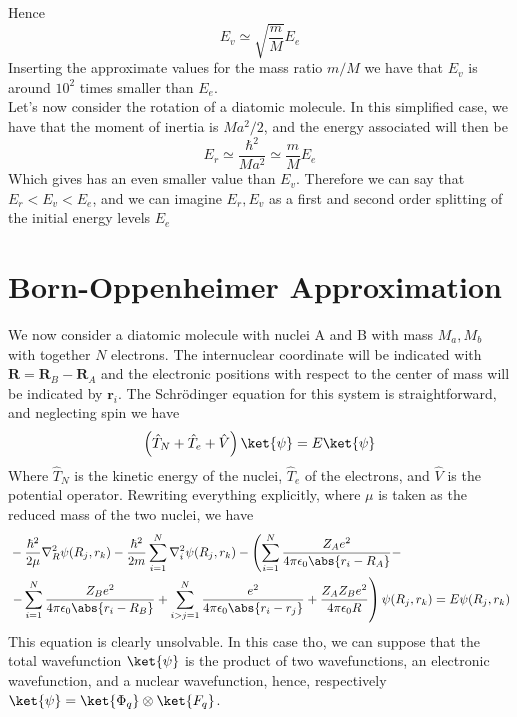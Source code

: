 \documentclass[a4paper, 11pt]{book}
\renewcommand{\vec}[1]{\mathbf{#1}}
\newcommand{\1}{\opr{\mathds{1}}}
\newcommand{\opr}[1]{\hat{#1}}
\theoremstyle{plain}
\begin{document}
	Hence
	\begin{equation*}
		E_v\simeq\sqrt{\frac{m}{M}}E_e
	\end{equation*}
	Inserting the approximate values for the mass ratio $m/M$ we have that $E_v$ is around $10^{2}$ times smaller than $E_e$.\\
	Let's now consider the rotation of a diatomic molecule. In this simplified case, we have that the moment of inertia is $Ma^2/2$, and the energy associated will then be
	\begin{equation*}
		E_r\simeq\frac{\hbar^2}{Ma^2}\simeq\frac{m}{M}E_e
	\end{equation*}
	Which gives has an even smaller value than $E_v$. Therefore we can say that $E_r<E_v<E_e$, and we can imagine $E_r,E_v$ as a first and second order splitting of the initial energy levels $E_e$
	\section{Born-Oppenheimer Approximation}
	We now consider a diatomic molecule with nuclei A and B with mass $M_a,M_b$ with together $N$ electrons. The internuclear coordinate will be indicated with $\vec{R}=\vec{R}_B-\vec{R}_A$ and the electronic positions with respect to the center of mass will be indicated by $\vec{r}_i$. The Schrödinger equation for this system is straightforward, and neglecting spin we have
	\begin{equation}
		\left( \opr{T}_N+\opr{T}_e+\opr{V} \right)\ket{\psi}=E\ket{\psi}
		\label{eq:diatomicmolhamiltonian}
	\end{equation}
	Where $\opr{T}_N$ is the kinetic energy of the nuclei, $\opr{T}_e$ of the electrons, and $\opr{V}$ is the potential operator. Rewriting everything explicitly, where $\mu$ is taken as the reduced mass of the two nuclei, we have
	\begin{equation}
		\begin{aligned}
			&-\frac{\hbar^2}{2\mu}\nabla_R^2\psi(R_j,r_k)-\frac{\hbar^2}{2m}\sum_{i=1}^N\nabla_i^2\psi(R_j,r_k)-\left(\sum_{i=1}^N\frac{Z_Ae^2}{4\pi\epsilon_0\abs{r_i-R_A}}-\right.\\
		&\left.-\sum_{i=1}^N\frac{Z_Be^2}{4\pi\epsilon_0\abs{r_i-R_B}}+\sum_{i>j=1}^N\frac{e^2}{4\pi\epsilon_0\abs{r_i-r_j}}+\frac{Z_AZ_Be^2}{4\pi\epsilon_0R}\right)\psi(R_j,r_k)=E\psi(R_j,r_k)
		\end{aligned}
		\label{eq:diatomicmolschrcomp}
	\end{equation}
	This equation is clearly unsolvable. In this case tho, we can suppose that the total wavefunction $\ket{\psi}$ is the product of two wavefunctions, an electronic wavefunction, and a nuclear wavefunction, hence, respectively $\ket{\psi}=\ket{\Phi_q}\otimes\ket{F_q}$.\\
\end{document}
